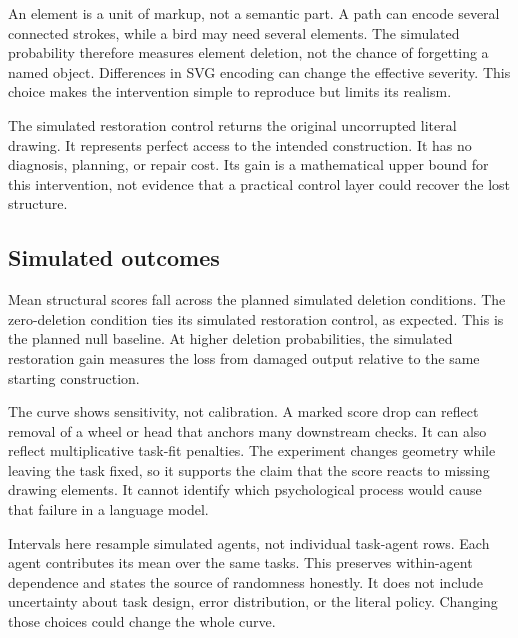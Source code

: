\documentclass{article}
\begin{document}
An element is a unit of markup, not a semantic part. A path can encode several connected strokes, while a bird may need several elements. The simulated probability therefore measures element deletion, not the chance of forgetting a named object. Differences in SVG encoding can change the effective severity. This choice makes the intervention simple to reproduce but limits its realism.

The simulated restoration control returns the original uncorrupted literal drawing. It represents perfect access to the intended construction. It has no diagnosis, planning, or repair cost. Its gain is a mathematical upper bound for this intervention, not evidence that a practical control layer could recover the lost structure.

\subsection{Simulated outcomes}
\begin{table}[ht]\centering\small\caption{Simulated population sweep. Intervals resample simulated agents with all their tasks retained. Gains are paired within each simulated agent.}\end{table}

Mean structural scores fall across the planned simulated deletion conditions. The zero-deletion condition ties its simulated restoration control, as expected. This is the planned null baseline. At higher deletion probabilities, the simulated restoration gain measures the loss from damaged output relative to the same starting construction.

The curve shows sensitivity, not calibration. A marked score drop can reflect removal of a wheel or head that anchors many downstream checks. It can also reflect multiplicative task-fit penalties. The experiment changes geometry while leaving the task fixed, so it supports the claim that the score reacts to missing drawing elements. It cannot identify which psychological process would cause that failure in a language model.

Intervals here resample simulated agents, not individual task-agent rows. Each agent contributes its mean over the same tasks. This preserves within-agent dependence and states the source of randomness honestly. It does not include uncertainty about task design, error distribution, or the literal policy. Changing those choices could change the whole curve.
\end{document}
